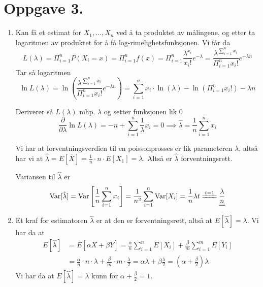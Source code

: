 \documentclass[a4paper,11pt,norsk]{article}
\begin{document}
\section*{Oppgave 3.}
\begin{enumerate}
    \item Kan få et estimat for $X_1, \dots, X_n$ ved å ta produktet av målingene, og etter ta logaritmen av produktet for å få log-rimelighetsfunksjonen.
        Vi får da
        \[
            L(\lambda) = \Pi_{i=1}^{n} P(X_i = x) = \Pi_{i=1}^{n} f(x) = \Pi_{i=1}^{n} \frac{\lambda^{x_i}}{x_i!}e^{-\lambda} = \frac{\lambda^{\sum_{i=1}^{n}{x_i}}}{\Pi_{i=1}^{n} x_i!} e^{-\lambda n}
        \]
        Tar så logaritmen
        \[
            \ln{L(\lambda)} = \ln{\left(\frac{\lambda^{\sum_{i=1}^{n}{x_i}}}{\Pi_{i=1}^{n} x_i!} e^{-\lambda n}\right)} = \sum_{i=1}^{n}{x_i} \cdot \ln{(\lambda)} - \ln{(\Pi_{i=1}^{n} x_i!)} - \lambda n
        \]

        Deriverer så $L(\lambda)$ mhp. $\lambda$ og setter funksjonen lik 0
        \[
            \frac{\partial}{\partial \lambda} \ln{L(\lambda)} = -n + \sum_{i=1}^{n}{\frac{1}{\lambda}x_i} = 0 \implies \hat{\lambda} = \frac{1}{n}\sum_{i=1}^{n}{x_i}
        \]

        Vi har at forventningsverdien til en poissonprosses er lik parameteren $\lambda$, altså har vi at $\hat{\lambda} = E[\overline{X}] = \frac{1}{n} \cdot n \cdot E[X_1] = \lambda$. Altså 
        er $\hat{\lambda}$ forventningsrett.
    
        Variansen til $\hat{\lambda}$ er 
        \[
            \text{Var}[\hat{\lambda}] = \text{Var}\left[\frac{1}{n} \sum_{i=1}^{n}x_i\right] = \frac{1}{n^2} \sum_{i=1}^{n}\text{Var}[X_i] = \frac{1}{n} \lambda t \xlongequal{t=1} \underline{\underline{\frac{\lambda}{n}}}
        \]

    \item Et kraf for estimatoren $\hat{\lambda}$ er at den er forventningsrett, altså at $E[\hat{\lambda}] = \lambda$. Vi har da at 
        \begin{align*}
            E[\hat{\lambda}] &= E[\alpha \overline{X} + \beta \overline{Y}] = \frac{\alpha}{n} \sum_{i=1}^{n} E[X_i] + \frac{\beta}{m} \sum_{i=1}^{m} E[Y_i] \\ 
                             &= \frac{\alpha}{n} \cdot n \cdot \lambda + \frac{\beta}{m} \cdot m \cdot \frac{\lambda}{2} = \alpha \lambda + \beta \frac{\lambda}{2} = \left(\alpha + \frac{\beta}{2}\right) \lambda
        \end{align*}
        Vi har da at $E[\hat{\lambda}] = \lambda$ kunn for $\alpha + \frac{\beta}{2} = 1$.


\end{enumerate}
\end{document}
